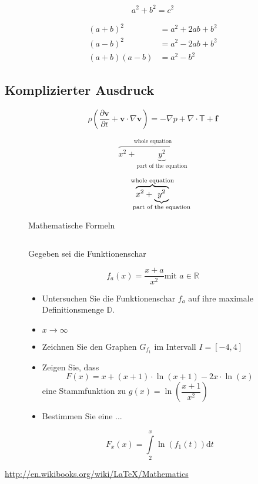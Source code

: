 \documentclass[10pt]{article}
\numberwithin{equation}{section}
\numberwithin{figure}{section}
\begin{document}
\begin{equation}
 	a^2 + b^2 = c^2\label{eq:a}
\end{equation}


\begin{align}
  (a+b)^2    &=    a^2+2ab+b^2 \nonumber \\
  (a-b)^2    &=    a^2-2ab+b^2 \nonumber \\
  (a+b)(a-b) &=    a^2-b^2
\end{align}

\subsection{Komplizierter Ausdruck}
\begin{figure}[h]
\[ \rho\left( \frac{\partial \mathbf{v}}{\partial t} + \mathbf{v}\cdot\nabla\mathbf{v}\right) = -\nabla p + \nabla\cdot\mathsf{T}+\mathbf{f} \]

\[ \overbrace{x^2 + \underbrace{y^2}_\text{part of the equation}}^\text{whole equation} \]

\[ \overbrace{x^2 + \underbrace{y^2}_{\mathclap{\text{part of the equation}}}}^{{\text{whole equation}}} \]
\caption{Mathematische Formeln}
\end{figure}

\begin{equation}
[]
\end{equation}

\begin{figure}
Gegeben sei die Funktionenschar

\[ f_a(x) = \frac{x+a}{x^2} \text{mit } a \in \mathbb{R} \]

\begin{itemize}
\item Untersuchen Sie die Funktionenschar \( f_a \) auf ihre maximale Definitionsmenge \( \mathbb{D} \).
\item \( x \to \infty \)
\item Zeichnen Sie den Graphen \( G_{f_1} \) im Intervall \( I = [-4,4] \)
\item Zeigen Sie, dass 
\[ F(x) = x+ (x+1)\cdot\ln(x+1)-2x\cdot\ln(x) \]
eine Stammfunktion zu \( g(x) = \ln\left(\dfrac{x+1}{x^2}\right) \)
\item Bestimmen Sie eine ...

\[ F_x(x) = \int\limits_2^x\ln\left(f_1(t)\right)\mathrm{d}t \]

\end{itemize}
\end{figure}

\url{http://en.wikibooks.org/wiki/LaTeX/Mathematics}
\end{document}
